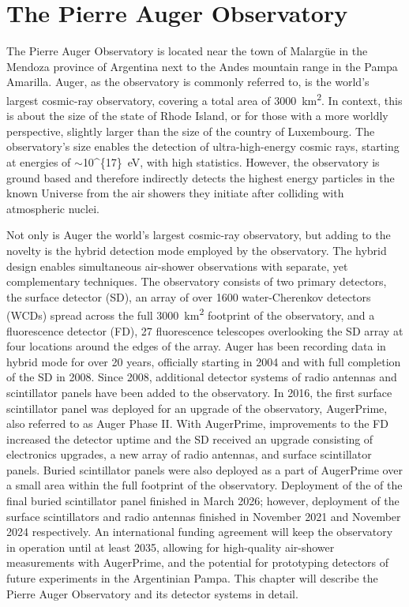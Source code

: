 %
%
\chapter{The Pierre Auger Observatory}\label{chap:auger}

The Pierre Auger Observatory is located near the town of Malarg\"ue in the Mendoza province of Argentina next to the Andes mountain range in the Pampa Amarilla.
Auger, as the observatory is commonly referred to, is the world's largest cosmic-ray observatory, covering a total area of \qty{3000}{\kilo\meter^{2}}.
In context, this is about the size of the state of Rhode Island, or for those with a more worldly perspective, slightly larger than the size of the country of Luxembourg.
The observatory's size enables the detection of ultra-high-energy cosmic rays, starting at energies of $\sim$\qty[parse-numbers=false]{10^{17}}{\electronvolt}, with high statistics.
However, the observatory is ground based and therefore indirectly detects the highest energy particles in the known Universe from the air showers they initiate after colliding with atmospheric nuclei.

Not only is Auger the world's largest cosmic-ray observatory, but adding to the novelty is the hybrid detection mode employed by the observatory.
The hybrid design enables simultaneous air-shower observations with separate, yet complementary techniques.
The observatory consists of two primary detectors, the surface detector (SD), an array of over 1600 water-Cherenkov detectors (WCDs) spread across the full \qty{3000}{\kilo\meter^{2}} footprint of the observatory, and a fluorescence detector (FD), 27 fluorescence telescopes overlooking the SD array at four locations around the edges of the array.
Auger has been recording data in hybrid mode for over 20 years, officially starting in 2004 and with full completion of the SD in 2008.
Since 2008, additional detector systems of radio antennas and scintillator panels have been added to the observatory.
In 2016, the first surface scintillator panel was deployed for an upgrade of the observatory, AugerPrime, also referred to as Auger Phase II.
With AugerPrime, improvements to the FD increased the detector uptime and the SD received an upgrade consisting of electronics upgrades, a new array of radio antennas, and surface scintillator panels.
Buried scintillator panels were also deployed as a part of AugerPrime over a small area within the full footprint of the observatory.
Deployment of the of the final buried scintillator panel finished in March 2026; however, deployment of the surface scintillators and radio antennas finished in November 2021 and November 2024 respectively.
An international funding agreement will keep the observatory in operation until at least 2035, allowing for high-quality air-shower measurements with AugerPrime, and the potential for prototyping detectors of future experiments in the Argentinian Pampa.
This chapter will describe the Pierre Auger Observatory and its detector systems in detail.


